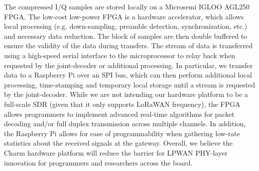  The compressed I/Q samples are stored locally on a Microsemi IGLOO AGL250 FPGA. The low-cost low-power FPGA is a hardware accelerator, which allows local processing (e.g. down-sampling, preamble detection, synchronization, etc.) and necessary data reduction.  The block of samples are then double buffered to ensure the validity of the data during transfers. The stream of data is transferred using a high-speed serial interface to the microprocessor to relay back when requested by the joint-decoder or additional processing. In particular, we transfer data to a Raspberry Pi over an SPI bus, which can then perform additional local processing, time-stamping and temporary local storage until a stream is requested by the joint-decoder. While we are not intending our hardware platform to be a full-scale SDR (given that it only supports LoRaWAN frequency), the FPGA allows programmers to implement advanced real-time algorithms for packet decoding and/or full duplex transmission across multiple channels. In addition, the Raspberry Pi allows for ease of programmability when gathering low-rate statistics about the received signals at the gateway. Overall, we believe the Charm hardware platform will reduce the barrier for LPWAN PHY-layer innovation for programmers and researchers across the board. 